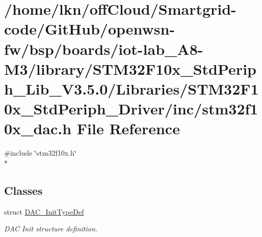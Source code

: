 \hypertarget{iot-lab___a8-_m3_2library_2_s_t_m32_f10x___std_periph___lib___v3_85_80_2_libraries_2_s_t_m32_f10880203e47357e59f617fa84d3539c2b5}{}\section{/home/lkn/off\+Cloud/\+Smartgrid-\/code/\+Git\+Hub/openwsn-\/fw/bsp/boards/iot-\/lab\+\_\+\+A8-\/\+M3/library/\+S\+T\+M32\+F10x\+\_\+\+Std\+Periph\+\_\+\+Lib\+\_\+\+V3.5.0/\+Libraries/\+S\+T\+M32\+F10x\+\_\+\+Std\+Periph\+\_\+\+Driver/inc/stm32f10x\+\_\+dac.h File Reference}
\label{iot-lab___a8-_m3_2library_2_s_t_m32_f10x___std_periph___lib___v3_85_80_2_libraries_2_s_t_m32_f10880203e47357e59f617fa84d3539c2b5}
{\ttfamily \#include \char`\"{}stm32f10x.\+h\char`\"{}}\\*
\subsection*{Classes}
\begin{DoxyCompactItemize}
\item 
struct \hyperlink{struct_d_a_c___init_type_def}{D\+A\+C\+\_\+\+Init\+Type\+Def}
\begin{DoxyCompactList}\small\item\em D\+AC Init structure definition. \end{DoxyCompactList}\end{DoxyCompactItemize}

